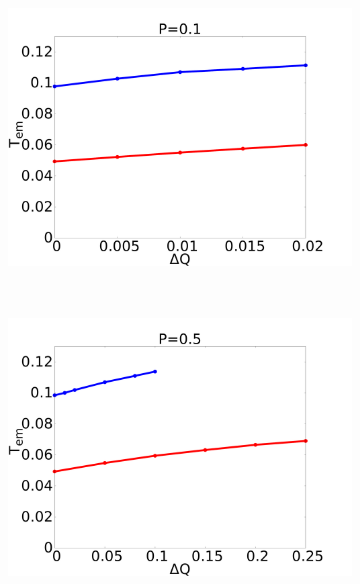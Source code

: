 \documentclass[handout]{beamer}
\begin{document}
\begin{frame}
\begin{figure}[h]
\begin{center}
\begin{subfigure}[t]{0.3\textwidth}
            \includegraphics[scale=0.09]{../images/p01_out.pdf}
        \end{subfigure} 
        \
        \begin{subfigure}[t]{0.3\textwidth}
            \includegraphics[scale=0.09]{../images/p05_out.pdf}
        \end{subfigure} 
        \
        \begin{subfigure}[t]{0.3\textwidth}

\end{subfigure}
\end{center}
\end{figure}
\end{frame}
\end{document}
